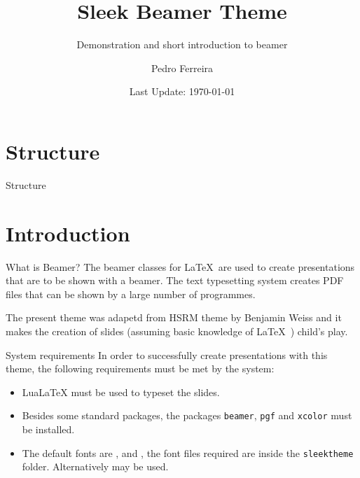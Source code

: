 \documentclass[compress,aspectratio=169]{beamer}
\title{Sleek Beamer Theme}
\subtitle{Demonstration and short introduction to beamer}
\date{Last Update: \today}
\author{Pedro Ferreira}
\institute{DEMEC\\ {\Medium FEUP}}
\begin{document}

\maketitle


\section*{Structure}
\begin{frame}{Structure}
	\tableofcontents[hideallsubsections]
\end{frame}

\section{Introduction}

\begin{frame}{What is Beamer?}
	The beamer classes for \LaTeX\ are used to create presentations that are to be shown with a beamer. The text typesetting system creates PDF files that can be shown by a large number of programmes.
	
	The present theme was adapetd from HSRM theme by Benjamin Weiss and it makes the creation of slides (assuming basic knowledge of \LaTeX\ ) child's play.
\end{frame}

\begin{frame}{System requirements}
	In order to successfully create presentations with this theme, the following requirements must be met by the system:
	\begin{itemize}
		\item LuaLaTeX must be used to typeset the slides.
		\item Besides some standard packages, the packages \texttt{beamer}, \texttt{pgf} and \texttt{xcolor} must be installed.
		\item The default fonts are ,  and , the font files required are inside the \texttt{sleektheme} folder. Alternatively  may be used.
	\end{itemize}
\end{frame}
\end{document}

